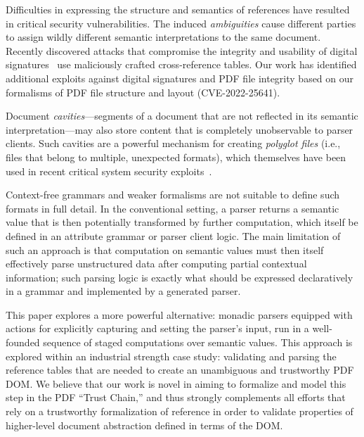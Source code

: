 Difficulties in expressing the structure and semantics of references
have resulted in critical security vulnerabilities.
%
The induced \emph{ambiguities} cause different parties
to assign wildly different semantic interpretations to the same
document.
%
Recently discovered attacks that compromise the integrity and
usability of digital
signatures~\cite{rohlmannBreakingSpecificationPDF2021,
mainkaShadowAttacksHiding2021} use maliciously crafted
cross-reference tables. Our work has identified  
additional exploits against digital signatures and PDF file integrity based on 
our formalisms of PDF file structure and layout (CVE-2022-25641).  

Document \emph{cavities}---segments of a document that are not
reflected in its semantic interpretation---may also store content that is
completely unobservable to parser clients.
%
Such cavities are a powerful mechanism for creating \emph{polyglot
files} (i.e., files that belong to multiple, unexpected formats),
which themselves have been used in recent critical system security
exploits~\cite{psychicPaper}.

Context-free grammars and weaker formalisms are not suitable to define 
such formats in full detail.
%
In the conventional setting, a parser returns a semantic value that is
then potentially transformed by further computation, which itself be
defined in an attribute grammar or parser client logic.
%
The main limitation of such an approach is that computation on
semantic values must then itself effectively parse unstructured data
after computing partial contextual information;
%
such parsing logic is exactly what should be expressed declaratively
in a grammar and implemented by a generated parser.

This paper explores a more powerful alternative: monadic parsers equipped 
with actions for explicitly capturing and setting the parser's input, run 
in a well-founded sequence of staged computations over semantic values.
%
This approach is explored within an industrial strength case study:
validating and parsing the reference tables that are needed to create 
an unambiguous and trustworthy PDF DOM.
%
We believe that our work is novel in aiming to formalize and model
this step in the PDF ``Trust Chain,'' and thus strongly complements all
efforts that rely on a trustworthy formalization of reference in order
to validate properties of higher-level document abstraction defined in
terms of the DOM.

